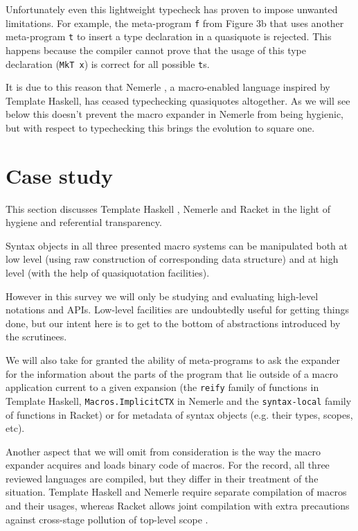\documentclass[10pt,journal,a4paper]{IEEEtran}
\begin{document}
Unfortunately even this lightweight typecheck has proven to impose unwanted limitations.
For example, the meta-program \small \texttt{f} \normalsize from Figure 3b
that uses another meta-program \small \texttt{t} \normalsize to insert a type declaration
in a quasiquote is rejected. This happens because the compiler cannot prove that
the usage of this type declaration (\small \texttt{MkT x}\normalsize)
is correct for all possible \small \texttt{t}\normalsize s.

It is due to this reason that Nemerle \cite{skalski04},
a macro-enabled language inspired by Template Haskell,
has ceased typechecking quasiquotes altogether. As we will see below this doesn't prevent
the macro expander in Nemerle from being hygienic, but with respect to typechecking
this brings the evolution to square one.

\section{Case study}

This section discusses Template Haskell \cite{sheard02},
Nemerle \cite{skalski04} and Racket \cite{barzilay11}
in the light of hygiene and referential transparency.

Syntax objects in all three presented macro systems can be manipulated
both at low level (using raw construction of corresponding data structure)
and at high level (with the help of quasiquotation facilities).

However in this survey we will only be studying and evaluating high-level notations and APIs.
Low-level facilities are undoubtedly useful for getting things done,
but our intent here is to get to the bottom of abstractions
introduced by the scrutinees.

We will also take for granted the ability of meta-programs to ask the expander
for the information about the parts of the program that lie outside of
a macro application current to a given expansion (the \small \texttt{reify} \normalsize family of functions
in Template Haskell, \small \texttt{Macros.ImplicitCTX} \normalsize in Nemerle and the
\small \texttt{syntax-local} \normalsize family of functions in Racket) or
for metadata of syntax objects (e.g. their types, scopes, etc).

Another aspect that we will omit from consideration is the way the macro expander
acquires and loads binary code of macros. For the record, all three reviewed languages are compiled,
but they differ in their treatment of the situation. Template Haskell and Nemerle require separate
compilation of macros and their usages, whereas Racket allows
joint compilation with extra precautions against cross-stage pollution of top-level scope \cite{flatt02}.
\end{document}
